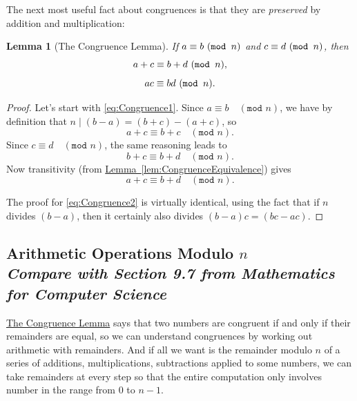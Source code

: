 \documentclass[11pt,oneside]{book}
\newtheorem{lem}[thm]{Lemma}
\theoremstyle{definition}
\begin{document}
The next most useful fact about congruences is that they are \emph{preserved} by addition and multiplication:
\begin{lem}[The Congruence Lemma] \label{lem:Congruence}
    If $a \equiv b\ (\textnormal{\texttt{mod }} n)$ and $c \equiv d\ (\textnormal{\texttt{mod }} n)$, then
    \begin{equation} a + c \equiv b + d\ (\textnormal{\texttt{mod }} n), \label{eq:Congruence1} \end{equation}
    \begin{equation} ac \equiv bd\ (\textnormal{\texttt{mod }} n). \label{eq:Congruence2} \end{equation}
\end{lem}
\begin{proof}
    Let's start with \eqref{eq:Congruence1}.
    Since $a \equiv b\quad (\texttt{mod } n)$, we have by definition that $n \mid (b - a) = (b + c) - (a + c)$, so
    \[ a + c \equiv b + c\quad (\texttt{mod } n). \]
    Since $c \equiv d\quad (\texttt{mod } n)$, the same reasoning leads to
    \[ b + c \equiv b + d\quad (\texttt{mod } n). \]
    Now transitivity (from \hyperref[lem:CongruenceEquivalence]{Lemma~\ref*{lem:CongruenceEquivalence}}) gives
    \[ a + c \equiv b + d\quad (\texttt{mod } n). \]

    The proof for \eqref{eq:Congruence2} is virtually identical, using the fact that if $n$ divides $(b - a)$, then it certainly also divides $(b - a)c = (bc - ac)$.
\end{proof}


\subsection[Arithmetic Operations Modulo $n$]{Arithmetic Operations Modulo $n$\\[0.5ex]
\normalsize\normalfont\textit{
    Compare with Section 9.7 from \emph{Mathematics for Computer Science}
}}
\hyperref[lem:Congruence]{The Congruence Lemma} says that two numbers are congruent if and only if their remainders are equal, so we can understand congruences by working out arithmetic with remainders.
And if all we want is the remainder modulo $n$ of a series of additions, multiplications, subtractions applied to some numbers, we can take remainders at every step so that the entire computation only involves number in the range from 0 to $n - 1$.

\
\end{document}
